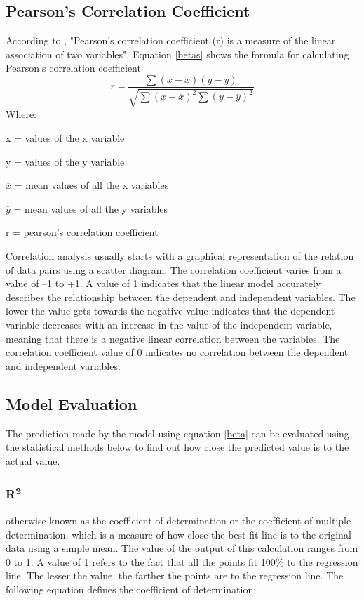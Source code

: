 \documentclass[conference]{IEEEtran}
\begin{document}
\subsection{Pearson's Correlation Coefficient}
According to \cite{ref1_pearson}, "Pearson's correlation coefficient (r) is a measure of the linear association of two variables". Equation \eqref{betas} shows the formula for calculating Pearson's correlation coefficient 
	\begin{equation}
		r = \frac{\sum{}(x-\overline{x})(y-\overline{y})}{\sqrt{\sum{}(x-\overline{x})^2\sum{}(y-\overline{y})^2}}\label{betas}
	\end{equation}	
	Where:
	\begin{description}
		\item x = values of the x variable
		\item y = values of the y variable
		\item $\overline{x}$ = mean values of all the x variables
		\item $\overline{y}$ = mean values of all the y variables
		\item r = pearson's correlation coefficient
	\end{description}
	 
Correlation analysis usually starts with a graphical representation of the relation of data pairs using a scatter diagram. The correlation coefficient varies from a value of –1 to +1. A value of 1 indicates that the linear model accurately describes the relationship between the dependent and independent variables. The lower the value gets towards the negative value indicates that the dependent variable decreases with an increase in the value of the independent variable, meaning that there is a negative linear correlation between the variables.
The correlation coefficient value of 0 indicates no correlation between the dependent and independent variables.
\subsection{Model Evaluation}
The prediction made by the model using equation \eqref{beta} can be evaluated using the statistical methods below to find out how close the predicted value is to the actual value.
\subsubsection{R\textsuperscript{2}}
otherwise known as the coefficient of determination or the coefficient of multiple determination, which is a measure of how close the best fit line is to the original data using a simple mean. The value of the output of this calculation ranges from 0 to 1\cite{DAE79009}. A value of 1 refers to the fact that all the points fit 100$\%$ to the regression line. The lesser the value, the farther the points are to the regression line. The following equation defines the coefficient of determination:
\end{document}
